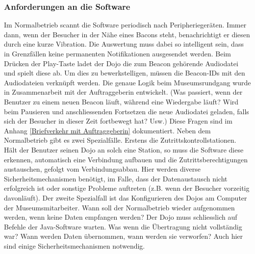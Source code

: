 \subsubsection{Anforderungen an die Software}
Im Normalbetrieb scannt die Software periodisch nach Peripheriegeräten. Immer dann, wenn der Besucher in der Nähe eines Bacons steht, benachrichtigt er diesen durch eine kurze Vibration. Die Auswertung muss dabei so intelligent sein, dass in Grenzfällen keine permanenten Notifikationen ausgesendet werden. Beim Drücken der Play-Taste ladet der Dojo die zum Beacon gehörende Audiodatei und spielt diese ab. Um dies zu bewerkstelligen, müssen die Beacon-IDs mit den Audiodateien verknüpft werden. 
Die genaue Logik beim Museumsrundgang wurde in Zusammenarbeit mit der Auftraggeberin entwickelt. (Was passiert, wenn der Benutzer zu einem neuen Beacon läuft, während eine Wiedergabe läuft? Wird beim Pausieren und anschliessenden Fortsetzen die neue Audiodatei geladen, falls sich der Besucher in dieser Zeit fortbewegt hat? Usw.) Diese Fragen sind im Anhang \ref{Briefverkehr mit Auftraggeberin} dokumentiert.
Neben dem Normalbetrieb gibt es zwei Spezialfälle. Erstens die Zutrittskontrollstationen. Hält der Benutzer seinen Dojo an solch eine Station, so muss die Software diese erkennen, automatisch eine 
Verbindung aufbauen und die Zutrittsberechtigungen austauschen, gefolgt vom Verbindungsabbau. Hier werden diverse Sicherheitsmechanismen benötigt, im Falle, dass der Datenaustausch nicht erfolgreich ist oder sonstige Probleme auftreten (z.B. wenn der Besucher vorzeitig davonläuft). 
Der zweite Spezialfall ist das Konfigurieren des Dojos am Computer der Museumsmitarbeiter. Wann soll der Normalbetrieb wieder aufgenommen werden, wenn keine Daten empfangen werden? Der Dojo muss schliesslich auf Befehle der Java-Software warten. Was wenn die Übertragung nicht vollständig war? Wann werden Daten übernommen, wann werden sie verworfen? Auch hier sind einige Sicherheitsmechanismen notwendig.
